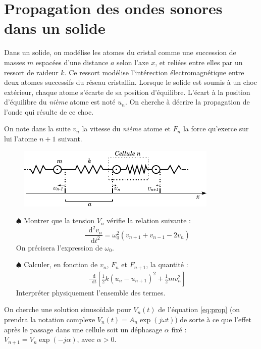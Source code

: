 \documentclass{report}
\newcommand*\dif{\mathop{}\!\mathrm{d}}
\begin{document}
\newpage

\section*{Propagation des ondes sonores dans un solide}

Dans un solide, on modélise les atomes du cristal comme une succession de masses $m$ espacées d'une distance $a$ selon l'axe $x$, et reliées entre elles par un ressort de raideur $k$. Ce ressort modélise l'intérection électromagnétique entre deux atomes successifs du réseau cristallin. Lorsque le solide est soumis à un choc extérieur, chaque atome s'écarte de sa position d'équilibre. L'écart à la position d'équilibre du \textit{nième} atome est noté $u_n$. On cherche à décrire la propagation de l'onde qui résulte de ce choc.

On note dans la suite $v_n$ la vitesse du \textit{nième} atome et $F_n$ la force qu'exerce sur lui l'atome $n+1$ suivant.

\begin{figure}[h!]
\centering
	\includegraphics[scale=1.8]{onde_longitudinale.pdf}
\end{figure}

\begin{itemize}

	\item[$\spadesuit$] Montrer que la tension $V_n$ vérifie la relation suivante :
	\begin{equation}
		\frac{\dif^2 v_n}{\dif t^2} =\omega_0^2(v_{n+1}+v_{n-1}-2v_n)
		\label{eq:prop}
	\end{equation}
	On précisera l'expression de $\omega_0$.
	
	 \item[$\spadesuit$] Calculer, en fonction de $v_n$, $F_n$ et $F_{n+1}$, la quantité :
	 \begin{align*}
	 	\frac{\dif}{\dif t}\left[ \frac{1}{2}k(u_n-u_{n+1})^2 + \frac{1}{2} mv_n^2 \right]
	 \end{align*}
	  Interpréter physiquement l'ensemble des termes.

\end{itemize}

On cherche une solution sinusoïdale pour $V_n(t)$ de l'équation \ref{eq:prop} (on prendra la notation complexe $V_n(t)=A_n\exp(j\omega t)$) de sorte à ce que l'effet après le passage dans une cellule soit un déphasage $\alpha$ fixé : $V_{n+1}=V_n\exp(-j\alpha)$, avec $\alpha>0$.
\end{document}
